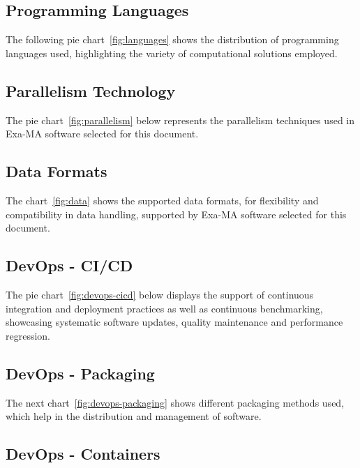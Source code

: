 \subsection{Programming Languages}

The following pie chart~\ref{fig:languages} shows the distribution of programming languages used, highlighting the variety of computational solutions employed.


\subsection{Parallelism Technology}


The pie chart~\ref{fig:parallelism} below represents the parallelism techniques used in Exa-MA software selected for this document.



\subsection{Data Formats}

The chart~\ref{fig:data} shows the supported data formats, for flexibility and compatibility in data handling, supported by Exa-MA software selected for this document.


\subsection{DevOps - CI/CD}

The pie chart~\ref{fig:devops-cicd} below displays the support of continuous integration and deployment practices as well as continuous benchmarking, showcasing systematic software updates, quality maintenance and performance regression.


\subsection{DevOps - Packaging}

The next chart~\ref{fig:devops-packaging} shows different packaging methods used, which help in the distribution and management of software.


\subsection{DevOps - Containers}

